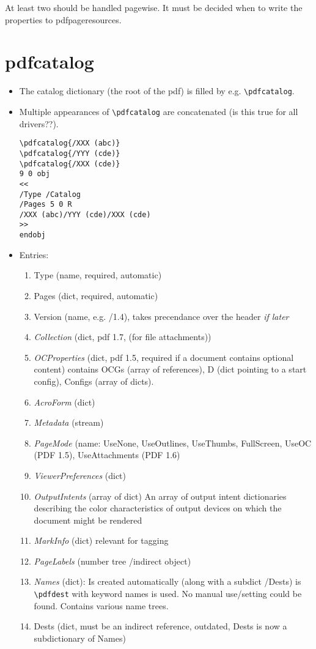 \documentclass{article}
\begin{document}
At least two should be handled pagewise.
It must be decided when to write the properties to pdfpageresources.

\section{pdfcatalog}
\begin{itemize}
\item The catalog dictionary (the root of the pdf) is filled by e.g. \verb+\pdfcatalog+.
\item Multiple appearances of  \verb+\pdfcatalog+ are concatenated (is this true for all drivers??).

\begin{verbatim}
\pdfcatalog{/XXX (abc)}
\pdfcatalog{/YYY (cde)}
\pdfcatalog{/XXX (cde)}
9 0 obj
<<
/Type /Catalog
/Pages 5 0 R
/XXX (abc)/YYY (cde)/XXX (cde)
>>
endobj
\end{verbatim}

\item Entries:
\begin{enumerate}
  \item Type (name, required, automatic)
  \item Pages (dict, required, automatic)
  \item Version (name, e.g. /1.4), takes precendance over the header \emph{if later}
  \item \emph{Collection} (dict, pdf 1.7, (for file attachments))
  \item \emph{OCProperties} (dict, pdf 1.5, required if a document contains optional content)
        contains OCGs (array of references), D (dict pointing to a start config), Configs (array of dicts).
  \item \emph{AcroForm} (dict)
  \item \emph{Metadata} (stream)
  \item \emph{PageMode} (name: UseNone, UseOutlines, UseThumbs, FullScreen, UseOC (PDF 1.5),
   UseAttachments (PDF 1.6)
  \item \emph{ViewerPreferences} (dict)
  \item \emph{OutputIntents} (array of dict)
  An array of output intent dictionaries describing the color characteristics of output devices on which the document might be rendered
  \item \emph{MarkInfo} (dict) relevant for tagging
  \item \emph{PageLabels} (number tree /indirect object)
  \item \emph{Names} (dict): Is created automatically (along with a subdict /Dests) is \verb+\pdfdest+ with keyword names is used. No manual use/setting could be found. Contains various name trees.
  \item Dests (dict, must be an indirect reference, outdated, Dests is now a subdictionary of Names)


\end{enumerate}
\end{itemize}
\end{document}
